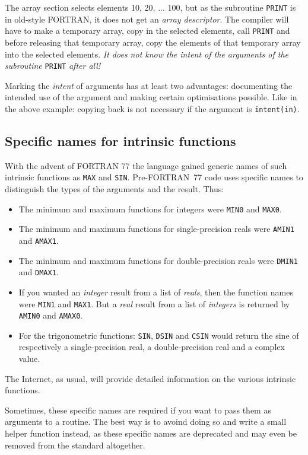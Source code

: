 The array section selects elements 10, 20, ... 100, but as the subroutine \verb+PRINT+
is in old-style FORTRAN, it does not get an \emph{array descriptor}. The compiler
will have to make a temporary array, copy in the selected elements, call \verb+PRINT+
and before releasing that temporary array, copy the elements of that temporary
array into the selected elements. \emph{It does not know the intent of the arguments
of the subroutine} \verb+PRINT+ \emph{after all!}

Marking the \emph{intent} of arguments has at least two advantages:
documenting the intended use of the argument and making certain optimisations
possible. Like in the above example: copying back is not necessary if the argument
is \verb+intent(in)+.


\subsection{Specific names for intrinsic functions}
With the advent of FORTRAN 77 the language gained generic names of such intrinsic
functions as \verb+MAX+ and \verb+SIN+. Pre-FORTRAN~77 code uses specific names
to distinguish the types of the arguments and the result. Thus:
\begin{itemize}
\item
The minimum and maximum functions for integers were \verb+MIN0+ and \verb+MAX0+.
\item
The minimum and maximum functions for single-precision reals were \verb+AMIN1+ and \verb+AMAX1+.
\item
The minimum and maximum functions for double-precision reals were \verb+DMIN1+ and \verb+DMAX1+.
\item
If you wanted an \emph{integer} result from a list of \emph{reals}, then the function names
were \verb+MIN1+ and \verb+MAX1+. But a \emph{real} result from a list of \emph{integers}
is returned by \verb+AMIN0+ and \verb+AMAX0+.
\item
For the trigonometric functions: \verb+SIN+, \verb+DSIN+ and \verb+CSIN+ would return
the sine of respectively a single-precision real, a double-precision real and a complex value.
\end{itemize}

The Internet, as usual, will provide detailed information on the various intrinsic functions.

Sometimes, these specific names are required if you want to pass them as arguments to a
routine. The best way is to avoind doing so and write a small helper function instead,
as these specific names are deprecated and may even be removed from the standard altogether.


